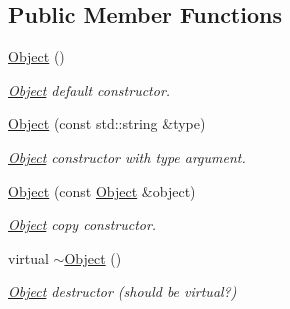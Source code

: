 \subsection*{Public Member Functions}
\begin{DoxyCompactItemize}
\item 
\mbox{\label{class_arcana_1_1_object_acb1521e4c8580906e56728d16b24c6e5}} 
\mbox{\hyperlink{class_arcana_1_1_object_acb1521e4c8580906e56728d16b24c6e5}{Object}} ()
\begin{DoxyCompactList}\small\item\em \mbox{\hyperlink{class_arcana_1_1_object}{Object}} default constructor. \end{DoxyCompactList}\item 
\mbox{\label{class_arcana_1_1_object_a9b9a5d995e9a713adb3b301a3882aa60}} 
\mbox{\hyperlink{class_arcana_1_1_object_a9b9a5d995e9a713adb3b301a3882aa60}{Object}} (const std\+::string \&type)
\begin{DoxyCompactList}\small\item\em \mbox{\hyperlink{class_arcana_1_1_object}{Object}} constructor with type argument. \end{DoxyCompactList}\item 
\mbox{\label{class_arcana_1_1_object_a0f38ca8789a77c3bca2f70d19a9fcdf0}} 
\mbox{\hyperlink{class_arcana_1_1_object_a0f38ca8789a77c3bca2f70d19a9fcdf0}{Object}} (const \mbox{\hyperlink{class_arcana_1_1_object}{Object}} \&object)
\begin{DoxyCompactList}\small\item\em \mbox{\hyperlink{class_arcana_1_1_object}{Object}} copy constructor. \end{DoxyCompactList}\item 
\mbox{\label{class_arcana_1_1_object_afa6ae7570a5abb7938af786a15154046}} 
virtual \mbox{\hyperlink{class_arcana_1_1_object_afa6ae7570a5abb7938af786a15154046}{$\sim$\+Object}} ()
\begin{DoxyCompactList}\small\item\em \mbox{\hyperlink{class_arcana_1_1_object}{Object}} destructor (should be virtual?) \end{DoxyCompactList}\item 
\mbox{\label{class_arcana_1_1_object_a2de0f40152fa8b1914a6449456757a24}} 

\end{DoxyCompactItemize}
